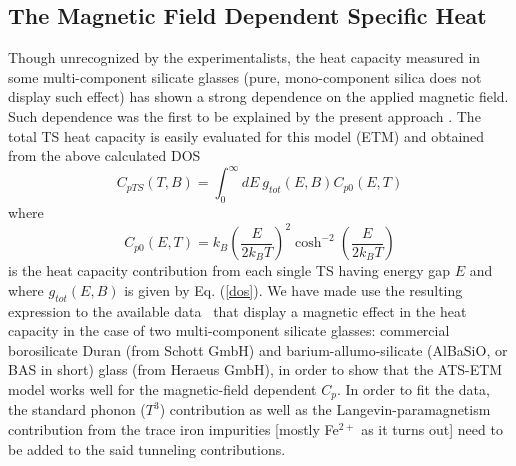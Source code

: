 \documentclass[10pt]{article}
\begin{document}
\subsection{The Magnetic Field Dependent Specific Heat}
Though unrecognized by the experimentalists, the heat capacity measured in 
some multi-component silicate glasses (pure, mono-component silica does not 
display such effect) has shown a strong dependence on the applied magnetic field. 
Such dependence was the first to be explained by the present approach 
\cite{Jug2004,Bon2015}. The total TS heat capacity is easily evaluated for this 
model (ETM) and obtained from the above calculated DOS
\begin{equation}
C_{pTS}(T,B)=\int_0^{\infty}dE~g_{tot}(E,B)C_{p0}(E,T)
\label{convolution}
\end{equation}
where
\begin{equation}
C_{p0}(E,T)=k_B\left( \frac{E}{2k_{B}T} \right)^2\cosh^{-2}\left(
\frac{E}{2k_{B}T} \right)
\end{equation}
is the heat capacity contribution from each single TS having energy gap $E$ and
where $g_{tot}(E,B)$ is given by Eq. (\ref{dos}).
We have made use the resulting expression to the available data~\cite{Sie2001} that 
display a magnetic effect in the heat capacity in the case of two multi-component 
silicate glasses: commercial borosilicate Duran (from Schott GmbH) and 
barium-allumo-silicate (AlBaSiO, or BAS in short) glass (from Heraeus GmbH), in 
order to show that the ATS-ETM model works well for the magnetic-field dependent 
$C_p$. In order to fit the data, the standard phonon ($T^3$) contribution as well as 
the Langevin-paramagnetism contribution from the trace iron impurities [mostly 
Fe$^{2+}$ as it turns out] need to be added to the said tunneling contributions. 
\end{document}
